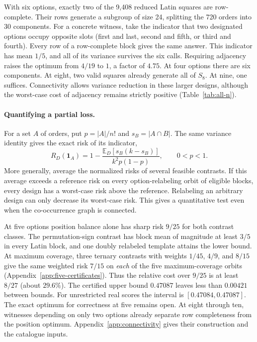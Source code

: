 With six options, exactly two of the 9,408 reduced Latin squares are
row-complete. Their rows generate a subgroup of size 24,
splitting the 720 orders into 30 components. For a concrete witness,
take the indicator that two designated options occupy opposite slots
(first and last, second and fifth, or third and fourth). Every row of
a row-complete block gives the same answer. This indicator has mean
$1/5$, and all of its variance survives the six calls. Requiring adjacency raises
the optimum from $4/19$ to $1$, a factor of $4.75$.
At four options there are six components. At eight, two valid squares
already generate all of $S_8$. At nine, one suffices. Connectivity
allows variance reduction in these larger designs, although the
worst-case cost of adjacency remains strictly positive
(Table~\ref{tab:all-n}).

\paragraph{Quantifying a partial loss.}
For a set $A$ of orders, put $p=|A|/n!$ and $s_B=|A\cap B|$.
The same variance identity gives the exact risk of its indicator,
\begin{equation}
 R_D(\mathbf1_A)=1-
 \frac{\mathbb E_D[s_B(k-s_B)]}{k^2 p(1-p)},\qquad 0<p<1 .
 \label{eq:cut}
\end{equation}
More generally, average the normalized risks of several feasible
contrasts. If this average exceeds a reference risk on every
option-relabeling orbit of eligible blocks, every design has a
worst-case risk above the reference. Relabeling an arbitrary design
can only decrease its worst-case risk. This gives a quantitative
test even when the co-occurrence graph is connected.

At five options position balance alone has sharp risk $9/25$ for
both contrast classes. The permutation-sign contrast has block mean of
magnitude at least $3/5$ in every Latin block, and one doubly relabeled
template attains the lower bound. At maximum coverage, three ternary
contrasts with weights $1/45$, $4/9$,
and $8/15$ give the same weighted risk $7/15$ on \emph{each} of the
five maximum-coverage orbits (Appendix~\ref{app:five-certificates}).
Thus the relative cost over $9/25$ is at least $8/27$ (about $29.6\%$).
The certified upper bound $0.47087$ leaves less than $0.00421$
between bounds. For unrestricted real scores the interval is
$[0.47084,0.47087]$. The exact optimum for correctness at five remains
open. At eight through ten, witnesses depending on only two options
already separate row completeness from the position optimum.
Appendix~\ref{app:connectivity} gives their construction and the
catalogue inputs.
